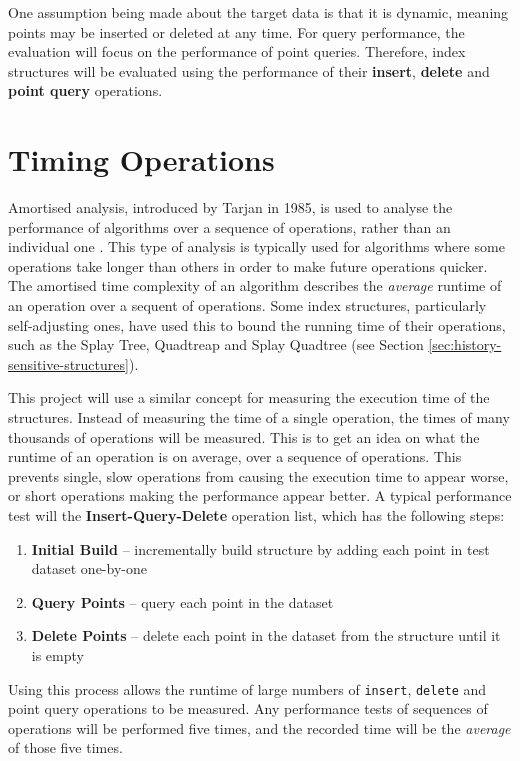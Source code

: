 One assumption being made about the target data is that it is dynamic, meaning points may be inserted or deleted at any time. For query performance, the evaluation will focus on the performance of point queries. Therefore, index structures will be evaluated using the performance of their \textbf{insert}, \textbf{delete} and \textbf{point query} operations.

\section{Timing Operations}
\label{sec:timing-operations}

Amortised analysis, introduced by Tarjan in 1985, is used to analyse the performance of algorithms over a sequence of operations, rather than an individual one \cite{amortised-analysis}. This type of analysis is typically used for algorithms where some operations take longer than others in order to make future operations quicker. The amortised time complexity of an algorithm describes the \textit{average} runtime of an operation over a sequent of operations. Some index structures, particularly self-adjusting ones, have used this to bound the running time of their operations, such as the Splay Tree, Quadtreap and Splay Quadtree (see Section \ref{sec:history-sensitive-structures}).

This project will use a similar concept for measuring the execution time of the structures. Instead of measuring the time of a single operation, the times of many thousands of operations will be measured. This is to get an idea on what the runtime of an operation is on average, over a sequence of operations. This prevents single, slow operations from causing the execution time to appear worse, or short operations making the performance appear better. A typical performance test will the \textbf{Insert-Query-Delete} operation list, which has the following steps:
\begin{enumerate}
	\item \textbf{Initial Build} -- incrementally build structure by adding each point in test dataset one-by-one
	\item \textbf{Query Points} -- query each point in the dataset
	\item \textbf{Delete Points} -- delete each point in the dataset from the structure until it is empty
\end{enumerate}
Using this process allows the runtime of large numbers of \texttt{insert}, \texttt{delete} and point query operations to be measured. Any performance tests of sequences of operations will be performed five times, and the recorded time will be the \textit{average} of those five times.

